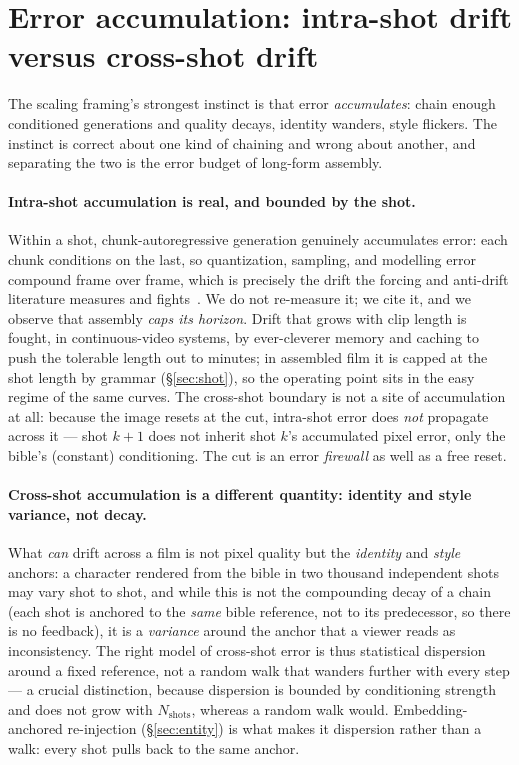 \documentclass[11pt]{article}
\newcommand{\Nshots}{\ensuremath{N_{\mathrm{shots}}}}
\begin{document}
\section{Error accumulation: intra-shot drift versus cross-shot drift}
\label{sec:error}

The scaling framing's strongest instinct is that error \emph{accumulates}: chain enough conditioned generations
and quality decays, identity wanders, style flickers. The instinct is correct about one kind of chaining and
wrong about another, and separating the two is the error budget of long-form assembly.

\paragraph{Intra-shot accumulation is real, and bounded by the shot.} Within a shot, chunk-autoregressive
generation genuinely accumulates error: each chunk conditions on the last, so quantization, sampling, and
modelling error compound frame over frame, which is precisely the drift the forcing and anti-drift literature
measures and fights~\cite{selfforcing,tethercache,framepack,rad}. We do not re-measure it; we cite it, and we
observe that assembly \emph{caps its horizon}. Drift that grows with clip length is fought, in continuous-video
systems, by ever-cleverer memory and caching to push the tolerable length out to minutes; in assembled film it is
capped at the shot length by grammar (\S\ref{sec:shot}), so the operating point sits in the easy regime of the
same curves. The cross-shot boundary is not a site of accumulation at all: because the image resets at the cut,
intra-shot error does \emph{not} propagate across it --- shot $k{+}1$ does not inherit shot $k$'s accumulated
pixel error, only the bible's (constant) conditioning. The cut is an error \emph{firewall} as well as a free
reset.

\paragraph{Cross-shot accumulation is a different quantity: identity and style variance, not decay.} What
\emph{can} drift across a film is not pixel quality but the \emph{identity} and \emph{style} anchors: a character
rendered from the bible in two thousand independent shots may vary shot to shot, and while this is not the
compounding decay of a chain (each shot is anchored to the \emph{same} bible reference, not to its predecessor,
so there is no feedback), it is a \emph{variance} around the anchor that a viewer reads as inconsistency. The
right model of cross-shot error is thus statistical dispersion around a fixed reference, not a random walk that
wanders further with every step --- a crucial distinction, because dispersion is bounded by conditioning strength
and does not grow with $\Nshots$, whereas a random walk would. Embedding-anchored re-injection (\S\ref{sec:entity})
is what makes it dispersion rather than a walk: every shot pulls back to the same anchor.
\end{document}
